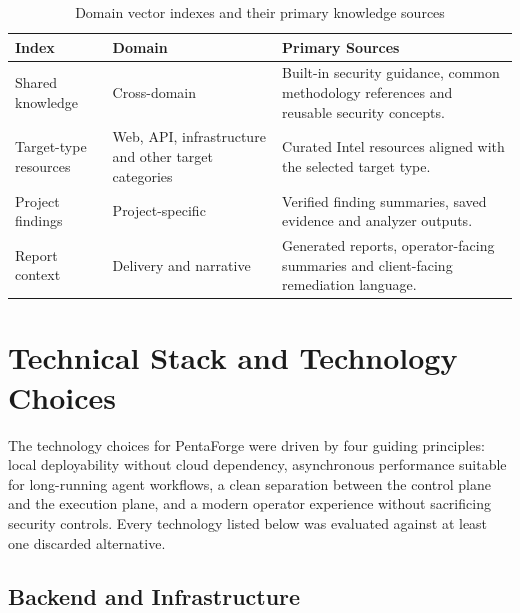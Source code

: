 \documentclass[12pt,a4paper]{report}
\begin{document}
\begin{table}[H]
    \centering
    \renewcommand{\arraystretch}{1.35}
    \begin{tabular}{|p{}|p{}|p{}|}
        \hline
        \textbf{Index} & \textbf{Domain} & \textbf{Primary Sources} \\
        \hline
        Shared knowledge & Cross-domain & Built-in security guidance, common
        methodology references and reusable security concepts. \\
        \hline
        Target-type resources & Web, API, infrastructure and other target categories
        & Curated Intel resources aligned with the selected target type. \\
        \hline
        Project findings & Project-specific & Verified finding summaries, saved
        evidence and analyzer outputs. \\
        \hline
        Report context & Delivery and narrative & Generated reports, operator-facing
        summaries and client-facing remediation language. \\
        \hline
    \end{tabular}
    \caption{Domain vector indexes and their primary knowledge sources}
    \label{tab:vector_indexes}
\end{table}

\section{Technical Stack and Technology Choices}

The technology choices for PentaForge were driven by four guiding principles:
local deployability without cloud dependency, asynchronous performance suitable
for long-running agent workflows, a clean separation between the control plane
and the execution plane, and a modern operator experience without sacrificing
security controls. Every technology listed below was evaluated against at least
one discarded alternative.

\subsection{Backend and Infrastructure}
\end{document}
